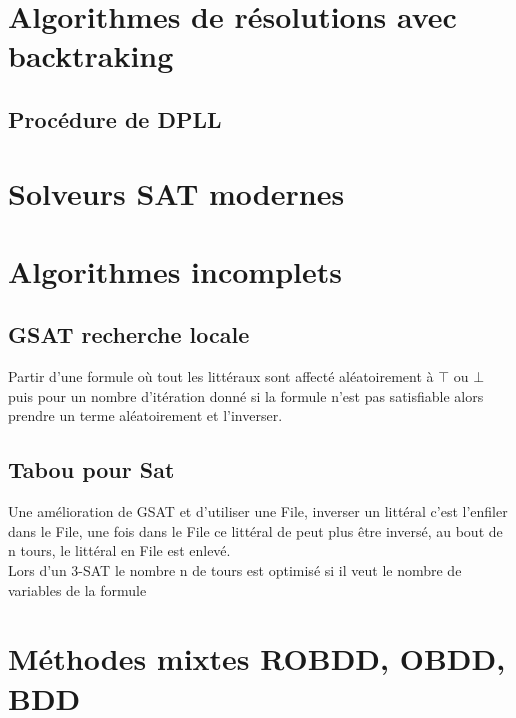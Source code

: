 \chapter{Algorithmes de résolutions avec backtraking}

\section{Procédure de DPLL}


\chapter{Solveurs SAT modernes}
\pagebreak

\chapter{Algorithmes incomplets}

\section{GSAT recherche locale}

Partir d'une formule où tout les littéraux sont affecté aléatoirement à $\top$ ou $\bot$ puis pour un nombre d'itération donné si la formule n'est pas satisfiable alors prendre un terme aléatoirement et l'inverser.\\

\section{Tabou pour Sat}

Une amélioration de GSAT et d'utiliser une File, inverser un littéral c'est l'enfiler dans le File, une fois dans le File ce littéral de peut plus être inversé, au bout de n tours, le littéral en File est enlevé.\\
Lors d'un 3-SAT le nombre n de tours est optimisé si il veut le nombre de variables de la formule\\

\pagebreak
\chapter{Méthodes mixtes ROBDD, OBDD, BDD}
\pagebreak

